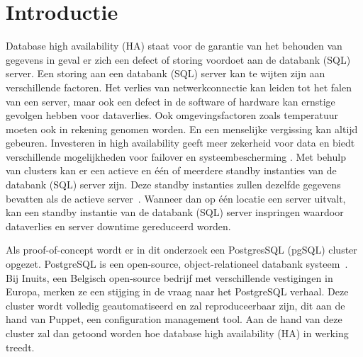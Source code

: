 
\section{Introductie} %
\label{sec:introductie}
Database high availability (HA) staat voor de garantie van het behouden van gegevens in geval er zich een defect of storing voordoet aan de databank (SQL) server. Een storing aan een databank (SQL) server kan te wijten zijn aan verschillende factoren. Het verlies van netwerkconnectie kan leiden tot het falen van een server, maar ook een defect in de software of hardware kan ernstige gevolgen hebben voor dataverlies. Ook omgevingsfactoren zoals temperatuur moeten ook in rekening genomen worden. En een menselijke vergissing kan altijd gebeuren. Investeren in high availability geeft meer zekerheid voor data en biedt verschillende mogelijkheden voor failover en systeembescherming \autocite{IBM1}. Met behulp van clusters kan er een actieve en één of meerdere standby instanties van de databank (SQL) server zijn. Deze standby instanties zullen dezelfde gegevens bevatten als de actieve server~\autocite{BDQ}. Wanneer dan op één locatie een server uitvalt, kan een standby instantie van de databank (SQL) server inspringen waardoor dataverlies en server downtime gereduceerd worden.

Als proof-of-concept wordt er in dit onderzoek een PostgresSQL (pgSQL) cluster opgezet. PostgreSQL is een open-source, object-relationeel databank systeem~\autocite{PostgreSQL2020}. Bij Inuits, een Belgisch open-source bedrijf met verschillende vestigingen in Europa, merken ze een stijging in de vraag naar het PostgreSQL verhaal. Deze cluster wordt volledig geautomatiseerd en zal reproduceerbaar zijn, dit aan de hand van Puppet, een configuration management tool. Aan de hand van deze cluster zal dan getoond worden hoe database high availability (HA) in werking treedt.



